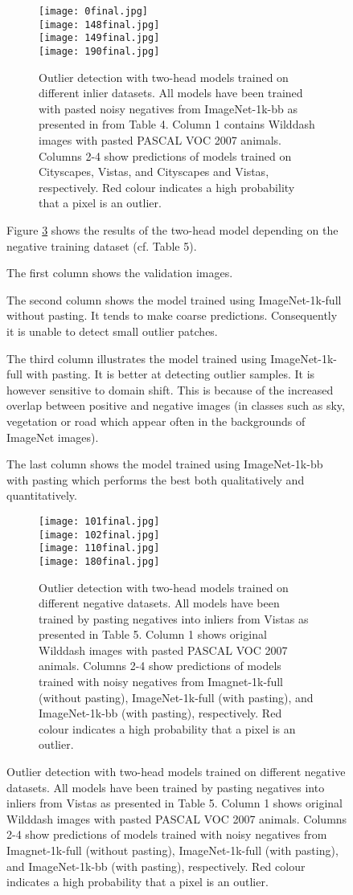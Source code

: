\documentclass[runningheads]{llncs}
\begin{document}
\begin{figure}[htb]
\begin{figure}[htb]
  \centering
  \texttt{[image: 0final.jpg]}\\
  \texttt{[image: 148final.jpg]}\\
  \texttt{[image: 149final.jpg]}\\
  \texttt{[image: 190final.jpg]}
  \caption{Outlier detection with two-head models
    trained on different inlier datasets.
    All models have been trained 
    with pasted noisy negatives 
    from ImageNet-1k-bb
    as presented in from Table 4.
    Column 1 contains Wilddash images 
    with pasted PASCAL VOC 2007 animals.
    Columns 2-4 show predictions of models
    trained on Cityscapes, Vistas, 
    and Cityscapes and Vistas, respectively.
    Red colour indicates a high probability 
    that a pixel is an outlier.
  }
  \label{fig:pw_ood_det_in_data}
\end{figure}

Figure \ref{fig:pw_ood_det_out_data} shows the
results of the two-head model depending on 
the negative training dataset (cf. Table 5).

The first column shows the validation images.

The second column shows the model trained 
using ImageNet-1k-full without pasting.
It tends to make coarse 
predictions. Consequently it is unable to
detect small outlier
patches.

The third column illustrates the model trained
using ImageNet-1k-full with pasting. It is better
at detecting outlier samples. It is however
sensitive to domain shift. This is because
of the increased overlap between positive and
negative images (in classes such as sky,
vegetation or road which appear often
in the backgrounds of ImageNet images).

The last column shows the model trained using
ImageNet-1k-bb with pasting which performs
the best both qualitatively and quantitatively.

\begin{figure}[htb]
  \centering
  \texttt{[image: 101final.jpg]}\\
  \texttt{[image: 102final.jpg]}\\
  \texttt{[image: 110final.jpg]}\\
  \texttt{[image: 180final.jpg]}
  \caption{Outlier detection with two-head models
    trained on different negative datasets.
    All models have been trained 
    by pasting negatives into 
    inliers from Vistas
    as presented in Table 5.
    Column 1 shows original Wilddash images 
    with pasted PASCAL VOC 2007 animals.
    Columns 2-4 show predictions of models
    trained with noisy negatives
    from Imagnet-1k-full (without pasting), 
    ImageNet-1k-full (with pasting), 
    and ImageNet-1k-bb (with pasting),
    respectively.
    Red colour indicates a high probability 
    that a pixel is an outlier.
  }
  \label{fig:pw_ood_det_out_data}
\end{figure}


\end{figure}
\end{document}
